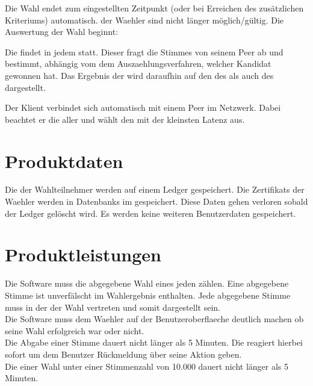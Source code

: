 \documentclass[parskip=full,11pt,twoside]{scrartcl}
\begin{document}
\pagebreak

Die \gls{Wahl} endet zum eingestellten Zeitpunkt (oder bei Erreichen des zusätzlichen Kriteriums) automatisch.  der \gls{Waehler} sind nicht länger möglich/gültig. Die Auswertung der \gls{Wahl} beginnt:

Die  findet in jedem  statt. Dieser fragt die \glspl{Stimme} von seinem \gls{Peer} ab und bestimmt, abhängig vom dem \gls{Auszaehlungsverfahren}, welcher \gls{Kandidat} gewonnen hat. Das Ergebnis der  wird daraufhin auf den  des  als auch des  dargestellt.

Der \gls{Klient} verbindet sich automatisch mit einem \gls{Peer} im \gls{Netzwerk}. Dabei beachtet er die  aller  und wählt den mit der kleinsten \gls{Latenz} aus.

\section{Produktdaten}

Die  der Wahlteilnehmer werden auf einem \gls{Ledger} gespeichert.
Die \glspl{Zertifikat} der \gls{Waehler} werden in \glspl{Datenbank} im  gespeichert.
Diese Daten gehen verloren sobald der \gls{Ledger} gelöscht wird. Es werden keine weiteren \gls{Benutzerdaten} gespeichert.

\pagebreak

\section{Produktleistungen}
Die Software muss die abgegebene \gls{Wahl} eines jeden  zählen. Eine abgegebene \gls{Stimme} ist unverfälscht im Wahlergebnis enthalten.
Jede abgegebene \gls{Stimme} muss in der  der \gls{Wahl} vertreten und somit dargestellt sein. \\
Die Software muss dem \gls{Waehler} auf der \gls{Benutzeroberflaeche} deutlich machen ob seine \gls{Wahl} erfolgreich war oder nicht. \\ 
Die Abgabe einer \gls{Stimme} dauert nicht länger als 5 Minuten.
Die  reagiert hierbei sofort um dem \gls{Benutzer} Rückmeldung über seine Aktion geben. \\
Die  einer \gls{Wahl} unter einer Stimmenzahl von 10.000  dauert nicht länger als 5 Minuten.
\end{document}
